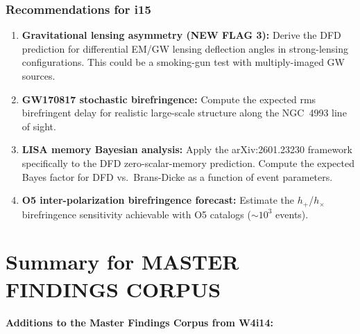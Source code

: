 \documentclass[11pt]{article}
\begin{document}
\section{Recommendations for i15}

\begin{enumerate}
\item \textbf{Gravitational lensing asymmetry (NEW FLAG 3):} Derive
  the DFD prediction for differential EM/GW lensing deflection angles
  in strong-lensing configurations. This could be a smoking-gun test
  with multiply-imaged GW sources.
\item \textbf{GW170817 stochastic birefringence:} Compute the expected
  rms birefringent delay for realistic large-scale structure along
  the NGC~4993 line of sight.
\item \textbf{LISA memory Bayesian analysis:} Apply the arXiv:2601.23230
  framework specifically to the DFD zero-scalar-memory prediction.
  Compute the expected Bayes factor for DFD vs.\ Brans-Dicke as a
  function of event parameters.
\item \textbf{O5 inter-polarization birefringence forecast:} Estimate
  the $h_+$/$h_\times$ birefringence sensitivity achievable with
  O5 catalogs ($\sim 10^3$ events).
\end{enumerate}


\part*{Summary for MASTER FINDINGS CORPUS}

\noindent\textbf{Additions to the Master Findings Corpus from W4i14:}
\end{document}
